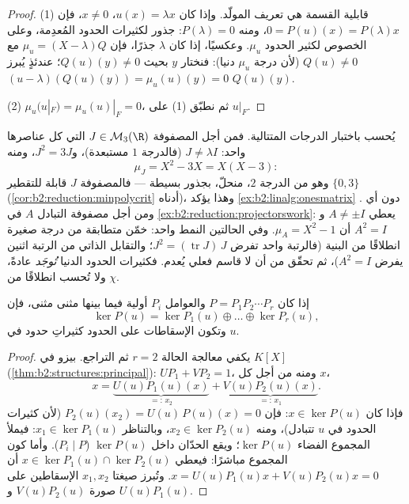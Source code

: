 \begin{proof}
(1) قابلية القسمة هي تعريف المولّد. وإذا كان $u(x) =
\lambda x$، $x \neq 0$، فإن $0 = P(u)(x) = P(\lambda)x$، ومنه
$P(\lambda) = 0$:  جذور لكثيرات الحدود المُعدِمة، وعلى
الخصوص لكثير الحدود $\mu_u$. وعكسيًا، إذا كان $\lambda$ جذرًا، فإن $\mu_u =
(X - \lambda)Q$ مع $Q(u) \neq 0$ (لأن درجة $\mu_u$ دنيا): فنختار
$y$ بحيث $Q(u)(y) \neq 0$؛ عندئذٍ يُبرز $(u - \lambda)(Q(u)(y)) = \mu_u(u)(y)
= 0$  $Q(u)(y)$.

(2) $\mu_u(u|_F) = \mu_u(u)|_F = 0$، ثم نطبّق (1) على $u|_F$.
\end{proof}

\begin{example}\label{ex:b2:reduction:minpolyhand}
يُحسب  باختبار الدرجات
المتتالية. فمن أجل المصفوفة $J \in \mathcal{M}_3(\R)$ التي كل عناصرها واحد:
$J \neq \lambda I$ (فالدرجة $1$ مستبعدة)، و$J^2 = 3J$، ومنه
\[
\mu_J = X^2 - 3X = X(X - 3) :
\]
وهو من الدرجة $2$، منحلّ، بجذور بسيطة --- فالمصفوفة $J$ قابلة للتقطير 
$\{0, 3\}$ (\cref{cor:b2:reduction:minpolycrit} أدناه)،
وهذا يؤكد \cref{ex:b2:linalg:onesmatrix} دون أي
. ومن أجل مصفوفة التبادل $A$ في
\cref{ex:b2:reduction:projectorswork}: يعطي $A \neq \pm I$ و$A^2
= I$ أن $\mu_A = X^2 - 1$. وفي الحالتين النمط
واحد: خمّن متطابقة من درجة صغيرة انطلاقًا من البنية
(فالرتبة واحد تفرض $J^2 = (\operatorname{tr}J)\,J$؛ والتقابل الذاتي من الرتبة اثنين
يفرض $A^2 = I$)، ثم تحقّق من أن لا قاسم فعلي
يُعدم. فكثيرات الحدود الدنيا \emph{تُوجَد} عادةً، ولا تُحسب
انطلاقًا من $\chi$.
\end{example}

\begin{theorem}\label{thm:b2:reduction:kernels}
إذا كان $P = P_1 P_2 \cdots P_r$ والعوامل $P_i$ أولية فيما بينها مثنى مثنى،
فإن
\[
\ker P(u) = \ker P_1(u) \oplus \dots \oplus \ker P_r(u),
\]
وتكون الإسقاطات على الحدود كثيراتِ حدود في $u$.
\end{theorem}

\begin{proof}
يكفي معالجة الحالة $r = 2$ ثم التراجع. بيزو في $K[X]$
(\cref{thm:b2:structures:principal}): $U P_1 + V P_2 = 1$، ومنه من أجل
كل $x$،
\[
x = \underbrace{U(u)P_1(u)(x)}_{=:\,x_2}
+ \underbrace{V(u)P_2(u)(x)}_{=:\,x_1}.
\]
فإذا كان $x \in \ker P(u)$: فإن $P_2(u)(x_2) = U(u)\,P(u)(x) = 0$ (لأن كثيرات الحدود
في $u$ تتبادل)، ومنه $x_2 \in \ker P_2(u)$، وبالتناظر $x_1
\in \ker P_1(u)$: فيملأ المجموع الفضاء $\ker P(u)$؛ ويقع الحدّان
داخل $\ker P(u)$ ($P_i \mid P$). وأما كون المجموع مباشرًا: فيعطي $x \in \ker P_1(u)
\cap \ker P_2(u)$ أن $x = U(u)P_1(u)x + V(u)P_2(u)x = 0$. وتُبرز
صيغتا $x_1, x_2$ الإسقاطين على صورة $V(u)P_2(u)$ و
$U(u)P_1(u)$.
\end{proof}

